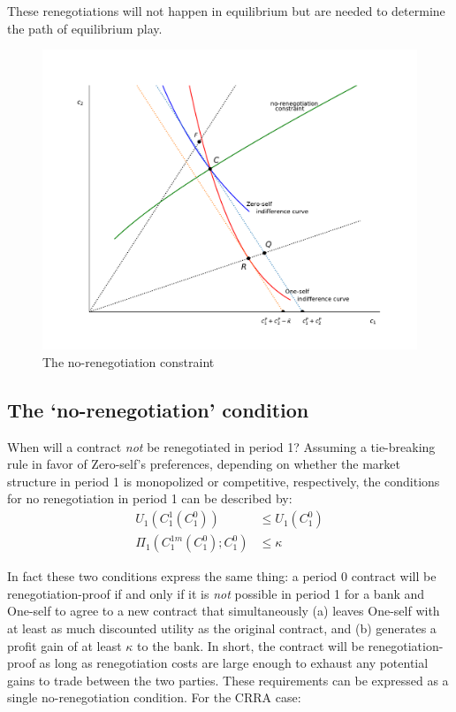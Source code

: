 \documentclass[11pt,english]{article}
\theoremstyle{plain}
\theoremstyle{definition}
\begin{document}
These renegotiations will not happen in equilibrium but are needed
to determine the path of equilibrium play.

 
\begin{figure}[p]
\includegraphics[scale=0.6]{Figure2.pdf}\caption{The no-renegotiation constraint}
\label{fig:renegproof} 
\end{figure}


\subsection{The `no-renegotiation' condition}

\label{sec-no-reneg-cond}

When will a contract \textit{not} be renegotiated in period 1? Assuming
a tie-breaking rule in favor of Zero-self's preferences, depending
on whether the market structure in period 1 is monopolized or competitive,
respectively, the conditions for no renegotiation in period 1 can be described by:
\begin{align}
U_{1}\left(C_{1}^{1}\left(C_{1}^{0}\right)\right) & \leq U_{1}\left(C_{1}^{0}\right)\label{eq:no-reg-comp}\\
\Pi_{1}\left(C_{1}^{1m}\left(C_{1}^{0}\right);C_{1}^{0}\right) & \leq\kappa\label{eq:no-reg-monop}
\end{align}

In fact these two conditions express the same thing: a period
0 contract will be renegotiation-proof if and only if it is \textit{not}
possible in period 1 for a bank and One-self to agree to a new contract
that simultaneously (a) leaves One-self with at least as much discounted
utility as the original contract, and (b) generates a profit gain
of at least $\kappa$ to the bank. In short, the contract will be renegotiation-proof
as long as renegotiation costs are large enough to exhaust any potential
gains to trade between the two parties. These requirements can be
expressed as a single no-renegotiation condition. For the CRRA case:
\end{document}
